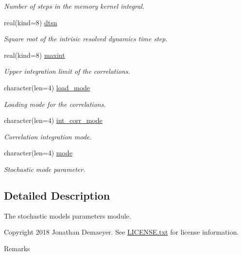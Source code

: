 \begin{DoxyCompactItemize}
\begin{DoxyCompactList}\small\item\em Number of steps in the memory kernel integral. \end{DoxyCompactList}\item 
real(kind=8) \hyperlink{namespacestoch__params_a53aa511c9ceefb077d913bf728b3f516}{dtsn}
\begin{DoxyCompactList}\small\item\em Square root of the intrisic resolved dynamics time step. \end{DoxyCompactList}\item 
real(kind=8) \hyperlink{namespacestoch__params_a50976593e79387f25e08fef6ce56b30b}{maxint}
\begin{DoxyCompactList}\small\item\em Upper integration limit of the correlations. \end{DoxyCompactList}\item 
character(len=4) \hyperlink{namespacestoch__params_ac61a48744a1bb015b5148c421837fbe7}{load\+\_\+mode}
\begin{DoxyCompactList}\small\item\em Loading mode for the correlations. \end{DoxyCompactList}\item 
character(len=4) \hyperlink{namespacestoch__params_ab901db3992a4df88db5a67fdd7be6ac6}{int\+\_\+corr\+\_\+mode}
\begin{DoxyCompactList}\small\item\em Correlation integration mode. \end{DoxyCompactList}\item 
character(len=4) \hyperlink{namespacestoch__params_a2c3f6439fd2d66413d065b533f2a6263}{mode}
\begin{DoxyCompactList}\small\item\em Stochastic mode parameter. \end{DoxyCompactList}\end{DoxyCompactItemize}


\subsection{Detailed Description}
The stochastic models parameters module. 

\begin{DoxyCopyright}{Copyright}
2018 Jonathan Demaeyer. See \hyperlink{LICENSE_8txt}{L\+I\+C\+E\+N\+S\+E.\+txt} for license information. 
\end{DoxyCopyright}
\begin{DoxyRemark}{Remarks}

\end{DoxyRemark}


